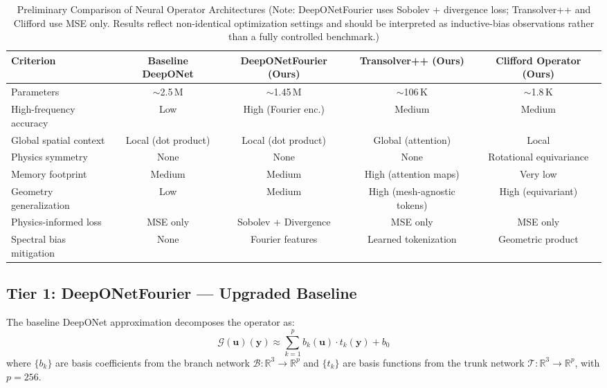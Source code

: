 \documentclass[conference]{IEEEtran}
\begin{document}
\begin{table}[htbp]
\caption{Preliminary Comparison of Neural Operator Architectures (Note: DeepONetFourier uses Sobolev + divergence loss; Transolver++ and Clifford use MSE only. Results reflect non-identical optimization settings and should be interpreted as inductive-bias observations rather than a fully controlled benchmark.)}
\label{tab:comparison}
\centering
\begin{tabular}{lcccc}
\toprule
\textbf{Criterion} & \textbf{Baseline DeepONet} & \textbf{DeepONetFourier (Ours)} & \textbf{Transolver++ (Ours)} & \textbf{Clifford Operator (Ours)} \\
\midrule
Parameters & $\sim$2.5\,M & $\sim$1.45\,M & $\sim$106\,K & $\sim$1.8\,K \\
High-frequency accuracy & Low & High (Fourier enc.) & Medium & Medium \\
Global spatial context & Local (dot product) & Local (dot product) & Global (attention) & Local \\
Physics symmetry & None & None & None & Rotational equivariance \\
Memory footprint & Medium & Medium & High (attention maps) & Very low \\
Geometry generalization & Low & Medium & High (mesh-agnostic tokens) & High (equivariant) \\
Physics-informed loss & MSE only & Sobolev + Divergence & MSE only & MSE only \\
Spectral bias mitigation & None & Fourier features & Learned tokenization & Geometric product \\
\bottomrule
\end{tabular}
\end{table}

\subsection{Tier 1: DeepONetFourier --- Upgraded Baseline}
\label{sec:deeponet_fourier}

The baseline DeepONet approximation \cite{lu2021deeponet, chen1995} decomposes the operator as:
\begin{equation}
\mathcal{G}(\bm{u})(\bm{y}) \approx \sum_{k=1}^{p} b_k(\bm{u}) \cdot t_k(\bm{y}) + b_0
\label{eq:deeponet_base}
\end{equation}
where $\{b_k\}$ are basis coefficients from the branch network $\mathcal{B}: \mathbb{R}^3 \to \mathbb{R}^p$ and $\{t_k\}$ are basis functions from the trunk network $\mathcal{T}: \mathbb{R}^3 \to \mathbb{R}^p$, with $p = 256$.
\end{document}
